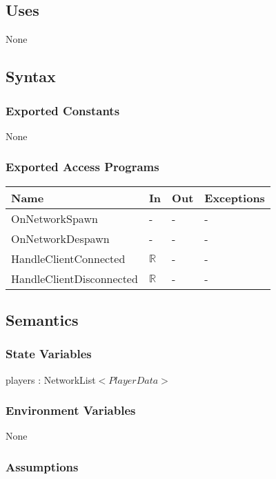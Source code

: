 \documentclass[12pt, titlepage]{article}
\begin{document}
\subsection{Uses}

None

\subsection{Syntax}

\subsubsection{Exported Constants}

None

\subsubsection{Exported Access Programs}

\begin{center}
\begin{tabular}{p{5cm} p{4cm} p{4cm} p{2cm}}
\hline
\textbf{Name} & \textbf{In} & \textbf{Out} & \textbf{Exceptions} \\
\hline
OnNetworkSpawn & - & - & - \\
OnNetworkDespawn  & - & - & - \\
HandleClientConnected  & $\mathbb{R}$ & - & - \\
HandleClientDisconnected  & $\mathbb{R}$ & - & - \\
\hline
\end{tabular}
\end{center}

\subsection{Semantics}

\subsubsection{State Variables}

players : NetworkList$<PlayerData>$

\subsubsection{Environment Variables}

None

\subsubsection{Assumptions}
\end{document}
